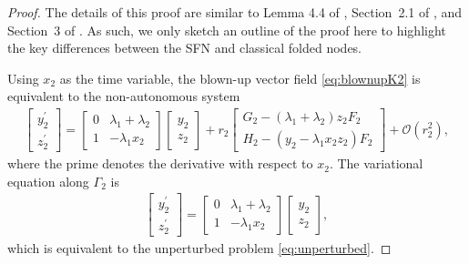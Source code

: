 \documentclass[10pt,onecolumn]{article}
\theoremstyle{plain}
\begin{document}
\begin{proof}
The details of this proof are similar to Lemma 4.4 of \cite{Szmolyan2001}, Section~2.1 of \cite{Mitry2017}, and Section~3 of \cite{Kristiansen2023}. As such, we only sketch an outline of the proof here to highlight the key differences between the SFN and classical folded nodes.

Using $x_2$ as the time variable, the blown-up vector field \eqref{eq:blownupK2} is equivalent to the non-autonomous system
%
\begin{equation*}
  \begin{split}
    \begin{bmatrix} y_2^\prime \\ z_2^\prime \end{bmatrix} = \begin{bmatrix} 0 & \lambda_1+\lambda_2 \\ 1 & -\lambda_1 x_2 \end{bmatrix} \begin{bmatrix} y_2 \\ z_2 \end{bmatrix} + r_2 \begin{bmatrix} G_2 - (\lambda_1+\lambda_2) z_2 F_2 \\ H_2 - (y_2 - \lambda_1 x_2 z_2) F_2 \end{bmatrix} + \mathcal O(r_2^2),
  \end{split}
\end{equation*}
%
where the prime denotes the derivative with respect to $x_2$.
The variational equation along $\Gamma_2$ is 
%
\begin{equation} \label{eq:variationalproof}
  \begin{split}
    \begin{bmatrix} y_2^\prime \\ z_2^\prime \end{bmatrix} = \begin{bmatrix} 0 & \lambda_1+\lambda_2 \\ 1 & -\lambda_1 x_2 \end{bmatrix} \begin{bmatrix} y_2 \\ z_2 \end{bmatrix},
  \end{split}
\end{equation}
%
which is equivalent to the unperturbed problem \eqref{eq:unperturbed}. 


\end{proof}
\end{document}
